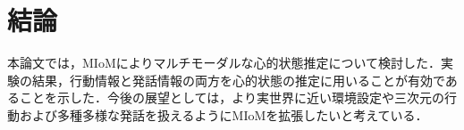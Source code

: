 \chapter{結論}
本論文では，MIoMによりマルチモーダルな心的状態推定について検討した．実験の結果，行動情報と発話情報の両方を心的状態の推定に用いることが有効であることを示した．今後の展望としては，より実世界に近い環境設定や三次元の行動および多種多様な発話を扱えるようにMIoMを拡張したいと考えている．
